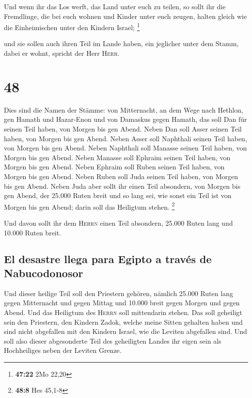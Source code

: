  Und wenn ihr das Los werft, das Land unter euch zu
teilen, so sollt ihr die Fremdlinge, die bei euch wohnen und Kinder
unter euch zeugen, halten gleich wie die Einheimischen unter den Kindern
Israel; \footnote{\textbf{47:22} 2Mo 22,20}

 und sie sollen auch ihren Teil im Lande haben, ein
jeglicher unter dem Stamm, dabei er wohnt, spricht der Herr
\textsc{Herr}.

\hypertarget{section-47}{%
\section{48}\label{section-47}}

 Dies sind die Namen der Stämme: von Mitternacht, an dem
Wege nach Hethlon, gen Hamath und Hazar-Enon und von Damaskus gegen
Hamath, das soll Dan für seinen Teil haben, von Morgen bis gen Abend.
 Neben Dan soll Asser seinen Teil haben, von Morgen bis
gen Abend.  Neben Asser soll Naphthali seinen Teil haben,
von Morgen bis gen Abend.  Neben Naphthali soll Manasse
seinen Teil haben, von Morgen bis gen Abend.  Neben
Manasse soll Ephraim seinen Teil haben, von Morgen bis gen Abend.
 Neben Ephraim soll Ruben seinen Teil haben, von Morgen
bis gen Abend.  Neben Ruben soll Juda seinen Teil haben,
von Morgen bis gen Abend.  Neben Juda aber sollt ihr einen
Teil absondern, von Morgen bis gen Abend, der 25.000 Ruten breit und so
lang sei, wie sonst ein Teil ist von Morgen bis gen Abend; darin soll
das Heiligtum stehen. \footnote{\textbf{48:8} Hes 45,1-8}

 Und davon sollt ihr dem \textsc{Herrn} einen Teil
absondern, 25.000 Ruten lang und 10.000 Ruten breit.

\hypertarget{el-desastre-llega-para-egipto-a-travuxe9s-de-nabucodonosor}{%
\subsection{El desastre llega para Egipto a través de
Nabucodonosor}\label{el-desastre-llega-para-egipto-a-travuxe9s-de-nabucodonosor}}

 Und dieser heilige Teil soll den Priestern gehören,
nämlich 25.000 Ruten lang gegen Mitternacht und gegen Mittag und 10.000
breit gegen Morgen und gegen Abend. Und das Heiligtum des \textsc{Herrn}
soll mittendarin stehen.  Das soll geheiligt sein den
Priestern, den Kindern Zadok, welche meine Sitten gehalten haben und
sind nicht abgefallen mit den Kindern Israel, wie die Leviten abgefallen
sind.  Und soll also dieser abgesonderte Teil des
geheiligten Landes ihr eigen sein als Hochheiliges neben der Leviten
Grenze.

